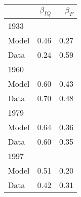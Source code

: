 \begin{tabular}{lrr}
\hline
  & $\beta_{IQ}$  & $\beta_{F}$  \\ 
\hline
1933 &   &   \\ 
Model & 0.46  & 0.27  \\ 
Data & 0.24  & 0.59  \\ 
1960 &   &   \\ 
Model & 0.60  & 0.43  \\ 
Data & 0.70  & 0.48  \\ 
1979 &   &   \\ 
Model & 0.64  & 0.36  \\ 
Data & 0.60  & 0.35  \\ 
1997 &   &   \\ 
Model & 0.51  & 0.20  \\ 
Data & 0.42  & 0.31  \\ 
\hline
\end{tabular}%
